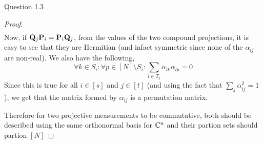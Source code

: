 \begin{solution}{Question 1.3}
\begin{proof}
\begin{equation}
\begin{split}
        \end{split}
    \end{equation}
    Now, if $\mathbf{Q}_j\mathbf{P}_i = \mathbf{P}_i\mathbf{Q}_j$, from the values of the two compound projections, it is easy to see that they are Hermitian (and infact symmetric since none of the $\alpha_{ij}$ are non-real). We also have the following,
    \begin{equation}
        \forall k \in S_i : \forall p \in [N]\setminus S_i: \sum_{l\in T_j}\alpha_{lk}\alpha_{lp} = 0
    \end{equation}
    Since this is true for all $i\in [s]$ and $j\in [t]$ (and using the fact that $\sum_j \alpha^2_{ij} = 1$), we get that the matrix formed by $\alpha_{ij}$ is a permutation matrix.
    
    Therefore for two projective measurements to be commutative, both should be described using the same orthonormal basis for $\mathbb{C}^n$ and their partion sets should partion $[N]$
    \end{proof}
\end{solution}
